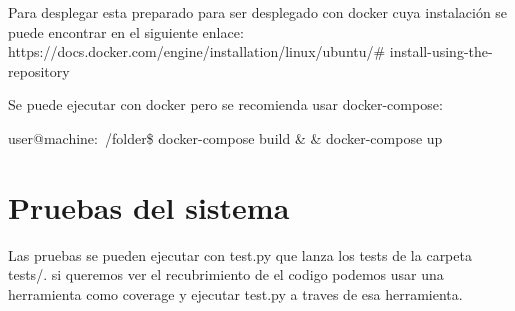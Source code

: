 Para desplegar esta preparado para ser desplegado con docker cuya instalación se puede encontrar en el siguiente enlace:
   https://docs.docker.com/engine/installation/linux/ubuntu/\# install-using-the-repository


Se puede ejecutar con docker pero se recomienda usar docker-compose:

user@machine:~/folder\$ docker-compose build \& \& docker-compose up 


\section{Pruebas del sistema}

Las pruebas se pueden ejecutar con test.py que lanza los tests de la carpeta tests/. si queremos ver el recubrimiento de el codigo podemos usar una herramienta como coverage y ejecutar test.py a traves de esa herramienta.  



